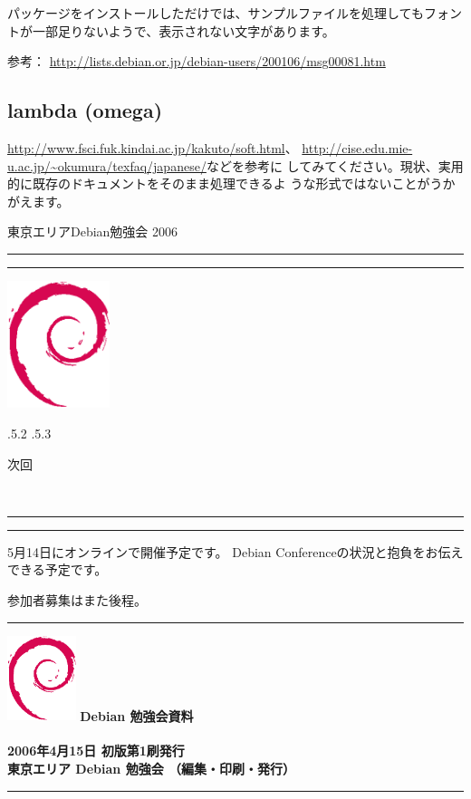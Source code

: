 \documentclass[mingoth,a4paper]{jsarticle}
\makeatletter
\renewcommand{\section}{\@startsection{section}{1}{\z@}%
    {\Cvs \@plus.5\Cdp \@minus.2\Cdp}%
    {.5\Cvs \@plus.3\Cdp}%
    {\normalfont\Large\headfont\raggedright\centering}} %
\newcommand{\dancersection}[2]{%
\newpage
東京エリアDebian勉強会 2006
\hrule
\vspace{0.5mm}
\hrule
\hfill{}\includegraphics[width=3cm]{image200502/openlogo-nd.eps}\\
\vspace{-4cm}
\begin{center}
  \section{#1}
\end{center}
\hfill{}#2\hspace{3cm}\space\\
\hrule
\hrule
\vspace{1cm}
}
\makeatother
\begin{document}
パッケージをインストールしただけでは、サンプルファイルを処理してもフォン
トが一部足りないようで、表示されない文字があります。

参考：
\url{http://lists.debian.or.jp/debian-users/200106/msg00081.htm}

\subsection{lambda (omega)}

\url{http://www.fsci.fuk.kindai.ac.jp/kakuto/soft.html}、
\url{http://cise.edu.mie-u.ac.jp/~okumura/texfaq/japanese/}などを参考に
してみてください。現状、実用的に既存のドキュメントをそのまま処理できるよ
うな形式ではないことがうかがえます。

\dancersection{次回}{}

5月14日にオンラインで開催予定です。
Debian Conferenceの状況と抱負をお伝えできる予定です。

参加者募集はまた後程。

\newpage

\vspace*{15cm}
\hrule
\vspace{2mm}
\includegraphics[width=2cm]{image200502/openlogo-nd.eps}
\noindent \Large \bf Debian 勉強会資料\\ \\
\noindent \normalfont 2006年4月15日 \hspace{5mm}  初版第1刷発行\\
\noindent \normalfont 東京エリア Debian 勉強会 （編集・印刷・発行）\\
\hrule
\end{document}
